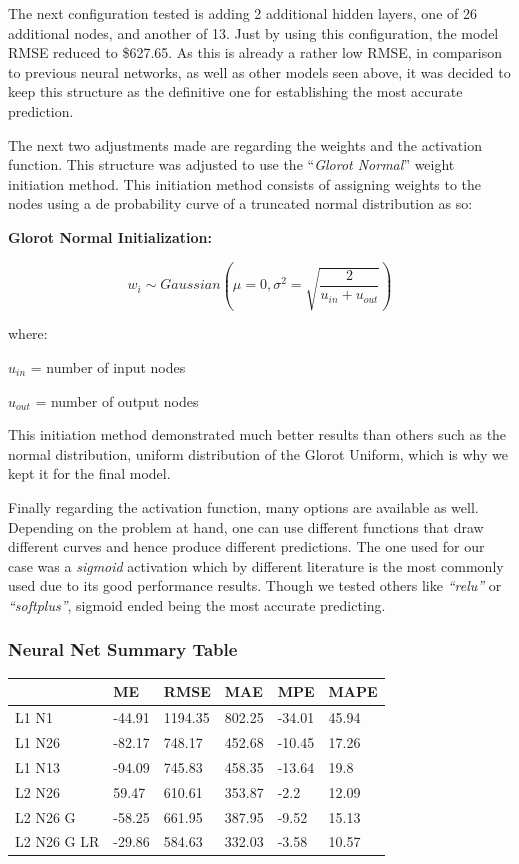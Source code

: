 \documentclass[
  paper=a4,
  ,captions=tableheading
]{scrartcl}
\begin{document}
The next configuration tested is adding 2 additional hidden layers, one
of 26 additional nodes, and another of 13. Just by using this
configuration, the model RMSE reduced to \$627.65. As this is already a
rather low RMSE, in comparison to previous neural networks, as well as
other models seen above, it was decided to keep this structure as the
definitive one for establishing the most accurate prediction.

The next two adjustments made are regarding the weights and the
activation function. This structure was adjusted to use the
``\emph{Glorot Normal}'' weight initiation method. This initiation
method consists of assigning weights to the nodes using a de probability
curve of a truncated normal distribution as so:

\textbf{Glorot Normal Initialization:}

\[w_{i} \sim Gaussian \left(\mu = 0, \sigma^{2} = \sqrt{\frac{2} {u_{in} + u_{out} }}\right)\]

where:

\(u_{in}\) = number of input nodes

\(u_{out}\) = number of output nodes

This initiation method demonstrated much better results than others such
as the normal distribution, uniform distribution of the Glorot Uniform,
which is why we kept it for the final model.

Finally regarding the activation function, many options are available as
well. Depending on the problem at hand, one can use different functions
that draw different curves and hence produce different predictions. The
one used for our case was a \emph{sigmoid} activation which by different
literature is the most commonly used due to its good performance
results. Though we tested others like \emph{``relu''} or
\emph{``softplus''}, sigmoid ended being the most accurate predicting.

\hypertarget{neural-net-summary-table}{%
\subsubsection{Neural Net Summary
Table}\label{neural-net-summary-table}}

\begin{table}[!h]
\centering
\begin{tabu} to 
\hline
  & ME & RMSE & MAE & MPE & MAPE\\
\hline
L1 N1 & -44.91 & 1194.35 & 802.25 & -34.01 & 45.94\\
\hline
L1 N26 & -82.17 & 748.17 & 452.68 & -10.45 & 17.26\\
\hline
L1 N13 & -94.09 & 745.83 & 458.35 & -13.64 & 19.8\\
\hline
L2 N26 & 59.47 & 610.61 & 353.87 & -2.2 & 12.09\\
\hline
L2 N26 G & -58.25 & 661.95 & 387.95 & -9.52 & 15.13\\
\hline
L2 N26 G LR & -29.86 & 584.63 & 332.03 & -3.58 & 10.57\\
\hline
\end{tabu}
\end{table}
\end{document}
